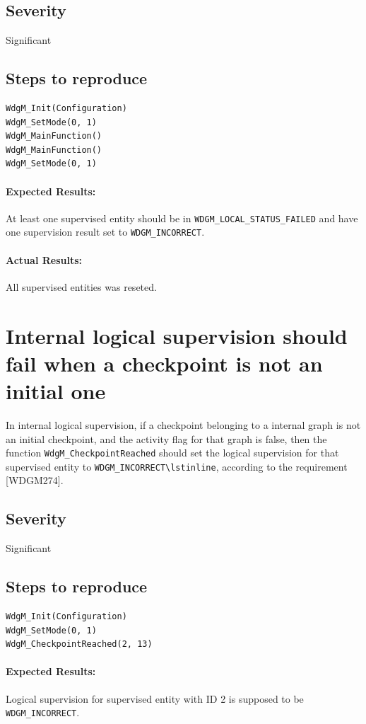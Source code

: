 \subsection{Severity}
Significant

\subsection{Steps to reproduce}
\begin{lstlisting}
WdgM_Init(Configuration)
WdgM_SetMode(0, 1)
WdgM_MainFunction()
WdgM_MainFunction()
WdgM_SetMode(0, 1)
\end{lstlisting}
\paragraph{Expected Results:}
At least one supervised entity should be in \lstinline!WDGM_LOCAL_STATUS_FAILED!
and have one supervision result set to \lstinline!WDGM_INCORRECT!.
\paragraph{Actual Results:}
All supervised entities was reseted.

\section{Internal logical supervision should fail when a checkpoint is not an initial one}
In internal logical supervision, if a checkpoint belonging to a
internal graph is not an initial checkpoint, and the activity flag for
that graph is false, then the function \lstinline!WdgM_CheckpointReached! should
set the logical supervision for that supervised entity to
\lstinline!WDGM_INCORRECT\lstinline!, according to the requirement [WDGM274].

\subsection{Severity}
Significant

\subsection{Steps to reproduce}
\begin{lstlisting}
WdgM_Init(Configuration)
WdgM_SetMode(0, 1)
WdgM_CheckpointReached(2, 13)
\end{lstlisting}
\paragraph{Expected Results:}
Logical supervision for supervised entity with ID 2 is supposed to be
\lstinline!WDGM_INCORRECT!.
